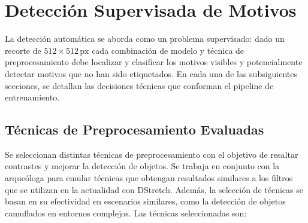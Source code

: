 \section{Detección Supervisada de Motivos}

La detección automática se aborda como un problema supervisado: dado un recorte de \(512\times512\,\text{px}\) cada combinación de modelo y técnica de preprocesamiento debe localizar y clasificar los motivos visibles y potencialmente detectar motivos que no han sido etiquetados.
En cada una de las subsiguientes secciones, se detallan las decisiones técnicas que conforman el pipeline de entrenamiento.

\subsection{Técnicas de Preprocesamiento Evaluadas}
\label{sec:preproc}
Se seleccionan distintas técnicas de preprocesamiento con el objetivo de resaltar contrastes y mejorar la detección de objetos.
Se trabaja en conjunto con la arqueóloga para emular técnicas que obtengan resultados similares a los filtros que se utilizan en la actualidad con DStretch.
Además, la selección de técnicas se basan en su efectividad en escenarios similares, como la detección de objetos camuflados en entornos complejos.
Las técnicas seleccionadas son:

